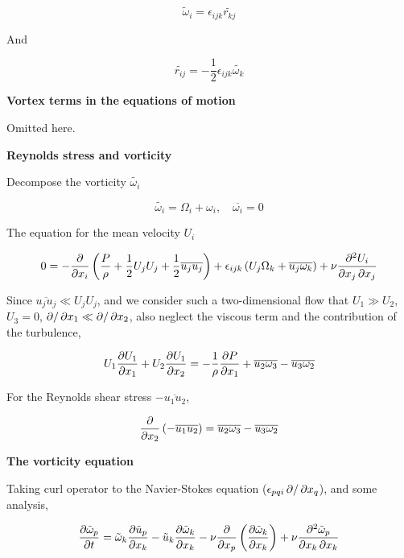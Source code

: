 \documentclass{article}
\begin{document}
\begin{equation*}
    \tilde\omega_i=\epsilon_{ijk}\tilde{r_{kj}}
\end{equation*}

And

\begin{equation*}
    \tilde{r_{ij}}=-\frac12\epsilon_{ijk}\tilde{\omega_k}
\end{equation*}

\textbf{Vortex terms in the equations of motion}

Omitted here.

\textbf{Reynolds stress and vorticity}

Decompose the vorticity $\tilde{\omega_i}$

\begin{equation*}
    \tilde{\omega_i}=\Omega_i+\omega_i,\quad\overline{\omega_i}=0
\end{equation*}

The equation for the mean velocity $U_i$

\begin{equation*}
    0=-\frac{\mathop{}\!\partial}{\mathop{}\!\partial x_i}\left(\frac{P}{\rho}+\frac12U_jU_j+\frac12\overline{u_ju_j}\right)+\epsilon_{ijk}\left(U_j\Omega_k+\overline{u_j\omega_k}\right)+\nu\frac{\mathop{}\!\partial^2U_i}{\mathop{}\!\partial x_j \mathop{}\!\partial x_j}
\end{equation*}

Since $\overline{u_ju_j}\ll U_jU_j$, and we consider such a two-dimensional flow that $U_1\gg U_2$, $U_3=0$, $\mathop{}\!\partial/\mathop{}\!\partial x_1\ll\mathop{}\!\partial/\mathop{}\!\partial x_2$, also neglect the viscous term and the contribution of the turbulence,

\begin{equation*}
    U_1\frac{\mathop{}\!\partial U_1}{\mathop{}\!\partial x_1}+U_2\frac{\mathop{}\!\partial U_1}{\mathop{}\!\partial x_2}=-\frac{1}{\rho}\frac{\mathop{}\!\partial P}{\mathop{}\!\partial x_1}+\overline{u_2\omega_3}-\overline{u_3\omega_2}
\end{equation*}

For the Reynolds shear stress $-\overline{u_1u_2}$,

\begin{equation*}
    \frac{\mathop{}\!\partial}{\mathop{}\!\partial x_2}\left(-\overline{u_1 u_2}\right)=\overline{u_2\omega_3}-\overline{u_3\omega_2}
\end{equation*}

\textbf{The vorticity equation}

Taking curl operator to the Navier-Stokes equation ($\epsilon_{pqi}\mathop{}\!\partial/\mathop{}\!\partial x_q$), and some analysis,

\begin{equation*}
    \frac{\p \tilde{\omega}_p}{\p t}=\tilde{\omega}_k\frac{\p \tilde{u}_p}{\p x_k}-\tilde{u}_k\frac{\p \tilde{\omega}_k}{\p x_k}-\nu\frac{\p}{\p x_p}\left(\frac{\p \tilde{\omega}_k}{\p x_k}\right)+\nu\frac{\p^2\tilde{\omega}_p}{\p x_k \p x_k}
\end{equation*}
\end{document}
